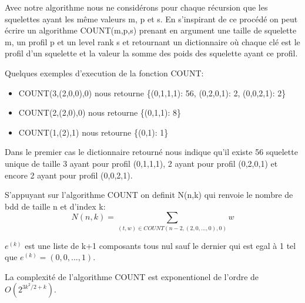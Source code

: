 \documentclass[french]{article}
\begin{document}
Avec notre algorithme nous ne considérons pour chaque récursion que les squelettes ayant les même valeurs m, p et s. 
En s'inspirant de ce procédé on peut écrire un algorithme COUNT(m,p,s) prenant en argument une taille de squelette m, un profil p et un level rank s et retournant un dictionnaire où chaque clé est le profil d'un squelette et la valeur la somme des poids des squelette ayant ce profil. 

Quelques exemples d'execution de la fonction COUNT:
\begin{itemize}
    \item COUNT(3,(2,0,0),0) nous retourne \{(0,1,1,1): 56, (0,2,0,1): 2, (0,0,2,1): 2\}
    \item COUNT(2,(2,0),0) nous retourne  \{(0,1,1): 8\}
    \item COUNT(1,(2),1) nous retourne \{(0,1): 1\}
\end{itemize}

Dans le premier cas le dictionnaire retourné nous indique qu'il existe 56 squelette unique de taille 3 ayant pour profil (0,1,1,1), 2 ayant pour profil (0,2,0,1) et encore 2 ayant pour profil (0,0,2,1).

\vspace{5mm} 

S'appuyant sur l'algorithme COUNT on definit N(n,k) qui renvoie le nombre de bdd de taille n et d'index k:
\[N(n,k)=\underset{(t,w)\in COUNT(n-2,(2,0,...,0),0)}{\sum} w\]

\(e^{(k)}\) est une liste de k+1 composants tous nul sauf le dernier qui est egal à 1 tel que \(e^{(k)} = (0,0,...,1)\).

La complexité de l'algorithme COUNT est exponentionel de l'ordre de \(O(2^{3k^2/2+k})\).
\end{document}
